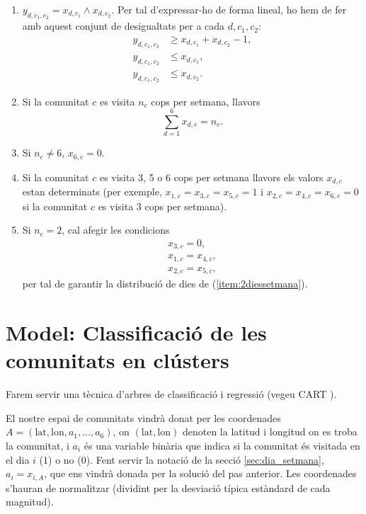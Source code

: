 \documentclass[12pt]{article}
\begin{document}
\begin{enumerate}
	\item $y_{d,c_1,c_2} = x_{d,c_1} \wedge x_{d, c_2}$.
		Per tal d'expressar-ho de forma lineal, ho hem de fer amb aquest conjunt de desigualtats per a cada $d,c_1,c_2$:
		\begin{align*}
			y_{d,c_1,c_2} &\geq x_{d,c_1} + x_{d,c_2} - 1, \\
			y_{d,c_1,c_2} &\leq x_{d,c_1}, \\
			y_{d,c_1,c_2} &\leq x_{d,c_2}.
		\end{align*}

	\item Si la comunitat $c$ es visita $n_c$ cops per setmana, llavors
		\[\sum_{d=1}^6 x_{d,c} = n_c .\]

	\item Si $n_c \neq 6$, $x_{6,c} = 0$.

	\item Si la comunitat $c$ es visita 3, 5 o 6 cops per setmana llavors els valors $x_{d,c}$ estan determinats (per exemple, $x_{1,c} = x_{3,c} = x_{5,c} = 1$ i $x_{2,c} = x_{4,c} = x_{6,c} = 0$ si la comunitat $c$ es visita 3 cops per setmana).

	\item Si $n_c = 2$, cal afegir les condicions
		\begin{align*}
			x_{3,c} = 0, \\
			x_{1,c} = x_{4,c}, \\
			x_{2,c} = x_{5,c},
		\end{align*}
		per tal de garantir la distribució de dies de (\ref{item:2diessetmana}).
\end{enumerate}

\section{Model: Classificació de les comunitats en clústers}

Farem servir una tècnica d'arbres de classificació i regressió (vegeu CART \cite{cart}).

El nostre espai de comunitats vindrà donat per les coordenades $A = (\mathrm{lat}, \mathrm{lon}, a_1, \dots, a_6)$, on $(\mathrm{lat}, \mathrm{lon})$ denoten la latitud i longitud on es troba la comunitat, i $a_i$ és una variable binària que indica si la comunitat és visitada en el dia $i$ (1) o no (0).
Fent servir la notació de la secció \ref{sec:dia_setmana}, $a_i = x_{i, A}$, que ens vindrà donada per la solució del pas anterior.
Les coordenades s'hauran de normalitzar (dividint per la desviació típica estàndard de cada magnitud).
\end{document}
